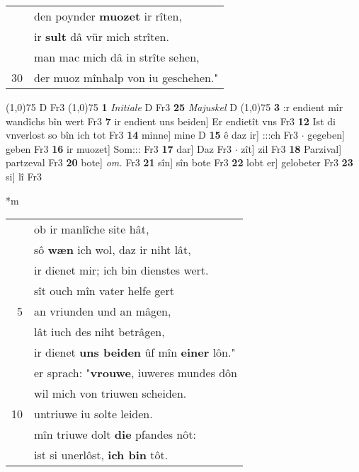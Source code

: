 \documentclass[8pt,a4paper,notitlepage]{article}
\begin{document}
\begin{table}[ht]
\begin{minipage}[t]{0.5\linewidth}
\begin{tabular}{rl}
 & den poynder \textbf{muozet} ir rîten,\\ 
 & ir \textbf{sult} dâ vür mich strîten.\\ 
 & man mac mich dâ in strîte sehen,\\ 
30 & der muoz mînhalp von iu geschehen."\\ 
\end{tabular}
\scriptsize
\line(1,0){75} \newline
D Fr3 \newline
\line(1,0){75} \newline
\textbf{1} \textit{Initiale} D Fr3  \textbf{25} \textit{Majuskel} D  \newline
\line(1,0){75} \newline
\textbf{3} :r endient mîr wandîchs bîn wert Fr3 \textbf{7} ir endient uns beiden] Er endietît vns Fr3 \textbf{12} Ist di vnverlost so bîn ich tot Fr3 \textbf{14} minne] mine D \textbf{15} ê daz ir] :::ch Fr3  $\cdot$ gegeben] geben Fr3 \textbf{16} ir muozet] Som::: Fr3 \textbf{17} dar] Daz Fr3  $\cdot$ zît] zil Fr3 \textbf{18} Parzival] partzeval Fr3 \textbf{20} bote] \textit{om.} Fr3 \textbf{21} sîn] sîn bote Fr3 \textbf{22} lobt er] gelobeter Fr3 \textbf{23} si] lî Fr3 \newline
\end{minipage}
\hspace{0.5cm}
\begin{minipage}[t]{0.5\linewidth}
\small
\begin{center}*m
\end{center}
\begin{tabular}{rl}
 & ob ir manlîche site hât,\\ 
 & sô \textbf{wæn} ich wol, daz ir niht lât,\\ 
 & ir dienet mir; ich bin dienstes wert.\\ 
 & sît ouch mîn vater helfe gert\\ 
5 & an vriunden und an mâgen,\\ 
 & lât iuch des niht betrâgen,\\ 
 & ir dienet \textbf{uns beiden} ûf mîn \textbf{einer} lôn."\\ 
 & er sprach: "\textbf{vrouwe}, iuweres mundes dôn\\ 
 & wil mich von triuwen scheiden.\\ 
10 & untriuwe iu solte leiden.\\ 
 & mîn triuwe dolt \textbf{die} pfandes nôt:\\ 
 & ist si unerlôst, \textbf{ich bin} tôt.\\ 

\end{tabular}
\end{minipage}
\end{table}
\end{document}
